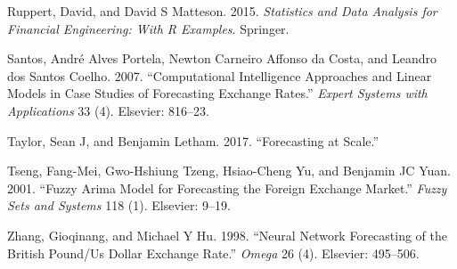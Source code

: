 \documentclass[12pt,preprint, authoryear]{elsarticle}
\numberwithin{equation}{section}
\numberwithin{figure}{section}
\numberwithin{table}{section}
\begin{document}
\hypertarget{ref-ruppert2015}{}
Ruppert, David, and David S Matteson. 2015. \emph{Statistics and Data
Analysis for Financial Engineering: With R Examples}. Springer.

\hypertarget{ref-santos2007}{}
Santos, André Alves Portela, Newton Carneiro Affonso da Costa, and
Leandro dos Santos Coelho. 2007. ``Computational Intelligence Approaches
and Linear Models in Case Studies of Forecasting Exchange Rates.''
\emph{Expert Systems with Applications} 33 (4). Elsevier: 816--23.

\hypertarget{ref-taylor2017}{}
Taylor, Sean J, and Benjamin Letham. 2017. ``Forecasting at Scale.''

\hypertarget{ref-tseng2001}{}
Tseng, Fang-Mei, Gwo-Hshiung Tzeng, Hsiao-Cheng Yu, and Benjamin JC
Yuan. 2001. ``Fuzzy Arima Model for Forecasting the Foreign Exchange
Market.'' \emph{Fuzzy Sets and Systems} 118 (1). Elsevier: 9--19.

\hypertarget{ref-zhang1998}{}
Zhang, Gioqinang, and Michael Y Hu. 1998. ``Neural Network Forecasting
of the British Pound/Us Dollar Exchange Rate.'' \emph{Omega} 26 (4).
Elsevier: 495--506.

\newpage
\nocite{*}

\end{document}
